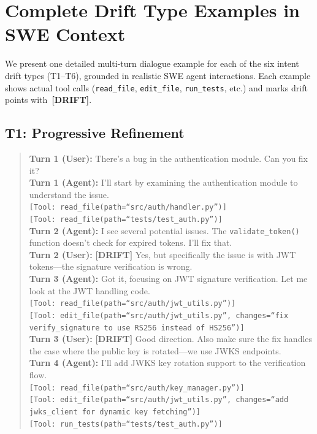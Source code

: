 
\section{Complete Drift Type Examples in SWE Context}
\label{app:drift-examples}

We present one detailed multi-turn dialogue example for each of the six intent drift types (T1--T6), grounded in realistic SWE agent interactions. Each example shows actual tool calls (\texttt{read\_file}, \texttt{edit\_file}, \texttt{run\_tests}, etc.) and marks drift points with~\textbf{[DRIFT]}.

\subsection{T1: Progressive Refinement}

\begin{quote}
\small
\textbf{Turn 1 (User):} There's a bug in the authentication module. Can you fix it?\\
\textbf{Turn 1 (Agent):} I'll start by examining the authentication module to understand the issue.\\
\texttt{[Tool: read\_file(path=``src/auth/handler.py'')]}\\
\texttt{[Tool: read\_file(path=``tests/test\_auth.py'')]}\\[4pt]
\textbf{Turn 2 (Agent):} I see several potential issues. The \texttt{validate\_token()} function doesn't check for expired tokens. I'll fix that.\\
\textbf{Turn 2 (User):} \textbf{[DRIFT]} Yes, but specifically the issue is with JWT tokens---the signature verification is wrong.\\[4pt]
\textbf{Turn 3 (Agent):} Got it, focusing on JWT signature verification. Let me look at the JWT handling code.\\
\texttt{[Tool: read\_file(path=``src/auth/jwt\_utils.py'')]}\\
\texttt{[Tool: edit\_file(path=``src/auth/jwt\_utils.py'', changes=``fix verify\_signature to use RS256 instead of HS256'')]}\\[4pt]
\textbf{Turn 3 (User):} \textbf{[DRIFT]} Good direction. Also make sure the fix handles the case where the public key is rotated---we use JWKS endpoints.\\[4pt]
\textbf{Turn 4 (Agent):} I'll add JWKS key rotation support to the verification flow.\\
\texttt{[Tool: read\_file(path=``src/auth/key\_manager.py'')]}\\
\texttt{[Tool: edit\_file(path=``src/auth/jwt\_utils.py'', changes=``add jwks\_client for dynamic key fetching'')]}\\
\texttt{[Tool: run\_tests(path=``tests/test\_auth.py'')]}
\end{quote}


